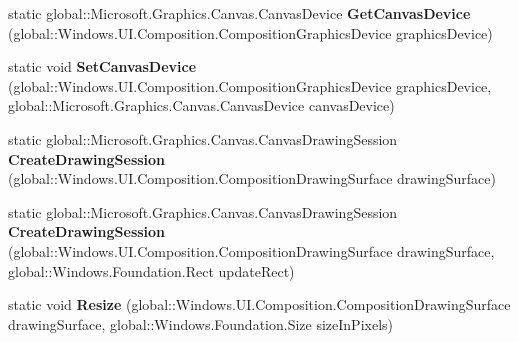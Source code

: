 \begin{DoxyCompactItemize}
static global\+::\+Microsoft.\+Graphics.\+Canvas.\+Canvas\+Device {\bfseries Get\+Canvas\+Device} (global\+::\+Windows.\+U\+I.\+Composition.\+Composition\+Graphics\+Device graphics\+Device)
\item 
\mbox{\label{class_microsoft_1_1_graphics_1_1_canvas_1_1_u_i_1_1_composition_1_1_canvas_composition_a80598aedf841c5ed7457b3b96fd2b114}} 
static void {\bfseries Set\+Canvas\+Device} (global\+::\+Windows.\+U\+I.\+Composition.\+Composition\+Graphics\+Device graphics\+Device, global\+::\+Microsoft.\+Graphics.\+Canvas.\+Canvas\+Device canvas\+Device)
\item 
\mbox{\label{class_microsoft_1_1_graphics_1_1_canvas_1_1_u_i_1_1_composition_1_1_canvas_composition_a1f8acd780668173cb52fdc3fcbcdc428}} 
static global\+::\+Microsoft.\+Graphics.\+Canvas.\+Canvas\+Drawing\+Session {\bfseries Create\+Drawing\+Session} (global\+::\+Windows.\+U\+I.\+Composition.\+Composition\+Drawing\+Surface drawing\+Surface)
\item 
\mbox{\label{class_microsoft_1_1_graphics_1_1_canvas_1_1_u_i_1_1_composition_1_1_canvas_composition_a55e464bf5949c3a7f758e8313be5e37a}} 
static global\+::\+Microsoft.\+Graphics.\+Canvas.\+Canvas\+Drawing\+Session {\bfseries Create\+Drawing\+Session} (global\+::\+Windows.\+U\+I.\+Composition.\+Composition\+Drawing\+Surface drawing\+Surface, global\+::\+Windows.\+Foundation.\+Rect update\+Rect)
\item 
\mbox{\label{class_microsoft_1_1_graphics_1_1_canvas_1_1_u_i_1_1_composition_1_1_canvas_composition_a73077ba32784e9ec043ebe0500e598ea}} 
static void {\bfseries Resize} (global\+::\+Windows.\+U\+I.\+Composition.\+Composition\+Drawing\+Surface drawing\+Surface, global\+::\+Windows.\+Foundation.\+Size size\+In\+Pixels)
\item 
\mbox{\label{class_microsoft_1_1_graphics_1_1_canvas_1_1_u_i_1_1_composition_1_1_canvas_composition_a3b9f17ccd00ef34c54c31646a4186a94}} 

\end{DoxyCompactItemize}
